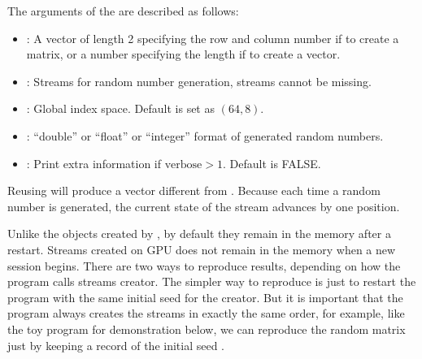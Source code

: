 \documentclass[article,nojss]{jss}\usepackage[]{graphicx}\usepackage[]{color}
\newcommand{\fct}[1]{\code{#1()}}
\begin{document}
The arguments of the \fct{runifGpu} are described as follows:
\begin{itemize}
\itemsep0em 
  \item {}: A vector of length 2 specifying the row and column number if to create a matrix, or a number specifying the length if to create a vector.
  \item {}: Streams for random number generation, streams cannot be missing.
  \item {}: Global index space. Default is set as $(64,8)$.
  \item {}: ``double'' or ``float'' or ``integer'' format of generated random numbers.
  \item {}: Print extra information if $\text{verbose} > 1$. Default is FALSE.
\end{itemize}
Reusing  will produce a vector different from . Because each time a random number is generated, the current state of the stream advances by one position. %

Unlike the objects created by , by default they remain in the memory after a restart. Streams created on GPU does not remain in the memory when a new  session begins. There are two ways to reproduce results, depending on how the program calls streams creator. The simpler way to reproduce is just to restart the program with the same initial seed for the creator.  But it is important that the program always creates the streams in exactly the same order, for example, like the toy  program for demonstration below, we can reproduce the random matrix  just by keeping a record of the initial seed .
\begin{CodeChunk}
\end{CodeChunk} 
\end{document}
